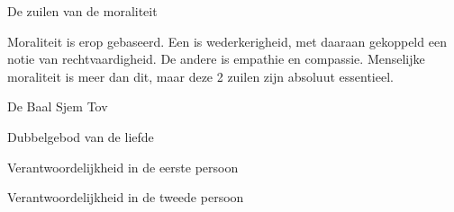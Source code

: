 \documentclass[main.tex]{subfiles}
\begin{document}
\begin{examenvraag}
    \begin{vraag}
        De zuilen van de moraliteit
    \end{vraag}

    \begin{antwoord}
		Moraliteit is erop gebaseerd.
		Een is wederkerigheid, met daaraan gekoppeld een notie van rechtvaardigheid. 
		De andere is empathie en compassie. 
		Menselijke moraliteit is meer dan dit, maar deze 2 zuilen zijn absoluut essentieel.
    \end{antwoord}
\end{examenvraag}


\begin{examenvraag}
    \begin{vraag}
        De Baal Sjem Tov
    \end{vraag}

    \begin{antwoord}

    \end{antwoord}
\end{examenvraag}


\begin{examenvraag}
    \begin{vraag}
        Dubbelgebod van de liefde
    \end{vraag}

    \begin{antwoord}

    \end{antwoord}
\end{examenvraag}


\begin{examenvraag}
    \begin{vraag}
        Verantwoordelijkheid in de eerste persoon
    \end{vraag}

    \begin{antwoord}

    \end{antwoord}
\end{examenvraag}


\begin{examenvraag}
    \begin{vraag}
        Verantwoordelijkheid in de tweede persoon
    \end{vraag}

    \begin{antwoord}

    \end{antwoord}
\end{examenvraag}
\end{document}
